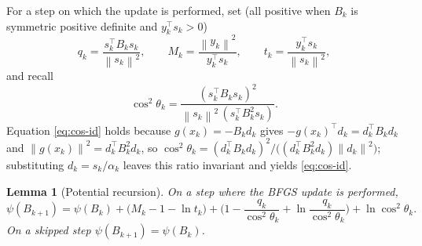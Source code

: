 \documentclass{amsart}
\newtheorem{lemma}{Lemma}
\theoremstyle{definition}
\newcommand{\norm}[1]{\left\lVert #1\right\rVert}
\begin{document}
For a step on which the update is performed, set (all positive when $B_k$ is
symmetric positive definite and $y_k^\top s_k>0$)
\begin{equation}\label{eq:scalars}
   q_k = \frac{s_k^\top B_k s_k}{\norm{s_k}^2},\qquad
   M_k = \frac{\norm{y_k}^2}{y_k^\top s_k},\qquad
   t_k = \frac{y_k^\top s_k}{\norm{s_k}^2},
\end{equation}
and recall
\begin{equation}\label{eq:cos-id}
   \cos^2\theta_k=\frac{(s_k^\top B_k s_k)^2}
                       {\norm{s_k}^2\,(s_k^\top B_k^2 s_k)} .
\end{equation}
Equation \eqref{eq:cos-id} holds because $g(x_k)=-B_k d_k$ gives
$-g(x_k)^\top d_k=d_k^\top B_k d_k$ and $\norm{g(x_k)}^2=d_k^\top B_k^2 d_k$, so
$\cos^2\theta_k=(d_k^\top B_k d_k)^2/\big((d_k^\top B_k^2 d_k)\norm{d_k}^2\big)$;
substituting $d_k=s_k/\alpha_k$ leaves this ratio invariant and yields
\eqref{eq:cos-id}.

\begin{lemma}[Potential recursion]\label{lem:psi-rec}
On a step where the BFGS update is performed,
\begin{equation}\label{eq:psi-exact}
   \psi(B_{k+1})=\psi(B_k)
   +\big(M_k-1-\ln t_k\big)
   +\Big(1-\frac{q_k}{\cos^2\theta_k}+\ln\frac{q_k}{\cos^2\theta_k}\Big)
   +\ln\cos^2\theta_k .
\end{equation}
On a skipped step $\psi(B_{k+1})=\psi(B_k)$.
\end{lemma}
\end{document}

